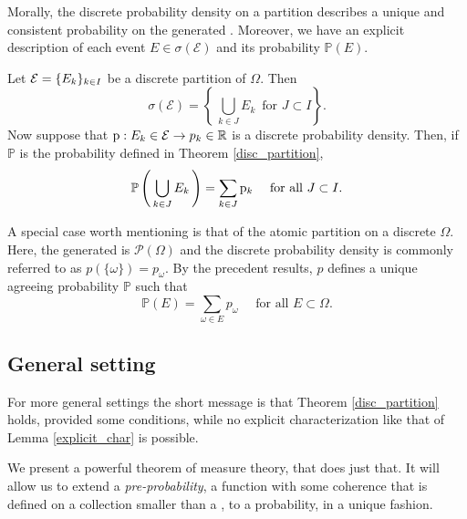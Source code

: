 Morally, the discrete probability density on a partition describes a unique and consistent probability on the generated \sigmaalg. 
Moreover, we have an explicit description of each event $E\in\sigma(\mathcal{E})$ and its probability $\mathbb{P}(E)$.

\begin{my_lemma}
	\label{explicit_char}
	Let $\mathcal{E}=\{ E_k \}_{k\in I}$ be a discrete partition of $\Omega$. Then
	\[
		\sigma( \mathcal{E} ) = \left\{ \, \bigcup_{k \in J} E_k \, \text{ for }J \subset I \right\}.
	\]
	Now suppose that $\mathrm{p} : E_k \in \mathcal{E} \to p_k \in \mathbb{R}$ is a discrete probability density. Then, if $\mathbb{P}$ is the probability defined in Theorem \ref{disc_partition},
	\[
		\mathbb{P} \left( \, \bigcup_{k \in J} E_k \,\right) = \sum_{k \in J} \mathrm{p}_k \quad \text{ for all }J \subset I.
	\]
\end{my_lemma}
 
\begin{my_remark}
	A special case worth mentioning is that of the atomic partition on a discrete $\Omega$. Here, the \sigmaalg  generated is $\mathcal{P}(\Omega)$ and the discrete probability density is commonly referred to as $p(\{ \omega \})=p_\omega$. By the precedent results, $p$ defines a unique agreeing probability $\mathbb{P}$ such that
	\begin{equation}
		\mathbb{P} \left( E \right) = \sum_{\omega \in E} p_\omega \quad \text{ for all }E \subset \Omega.		
	\end{equation}
\end{my_remark}

\subsection{General setting}

For more general settings the short message is that Theorem \ref{disc_partition} holds, provided some conditions, while no explicit characterization like that of Lemma \ref{explicit_char} is possible.

We present a powerful theorem of measure theory, that does just that. It will allow us to extend a \textit{pre-probability}, a function with some coherence that is defined on a collection smaller than a \sigmaalg , to a probability, in a unique fashion.

